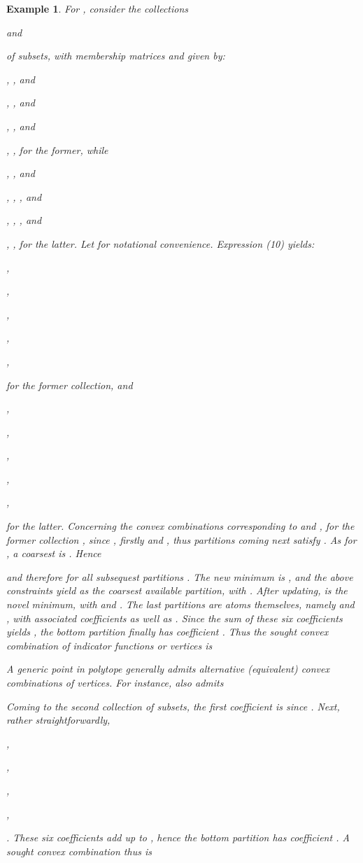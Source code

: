\documentclass[a4paper,10pt]{article}
\newtheorem{example}[theorem]{Example}
\begin{document}
\begin{example}
For , consider the collections

 and

 of subsets, with membership matrices  and  given by:

, ,  and

, ,  and

, ,  and

, ,  for the former, while

, ,  and

, , ,  and

, , ,  and

, ,  for the latter. Let  for notational convenience. Expression (10) yields:

,

,

,

,

,

 for the former collection, and

,

,

,

,

,

 for the latter. Concerning the convex combinations corresponding to 
and , for the former collection , since , firstly  and
, thus partitions  coming next satisfy .
As  for , a coarsest  is . Hence

and therefore  for all subsequest partitions .
The new minimum is , and the above constraints yield   as the coarsest available partition, with
. After updating,  is the novel minimum, with  and
.
The last partitions  are atoms themselves, namely  and , with associated coefficients
 as well as
.
Since the sum of these six coefficients yields , the bottom partition finally has coefficient
.
Thus the sought convex combination of indicator functions or vertices  is 

A generic point in polytope  generally admits alternative (equivalent)
convex combinations of vertices. For instance,  also admits

Coming to the second collection  of subsets, the first coefficient is 
since . Next, rather straightforwardly,

,

,

,

,

. These six coefficients add up to , hence the bottom partition has coefficient
. A sought convex combination thus is

\end{example}
\end{document}
